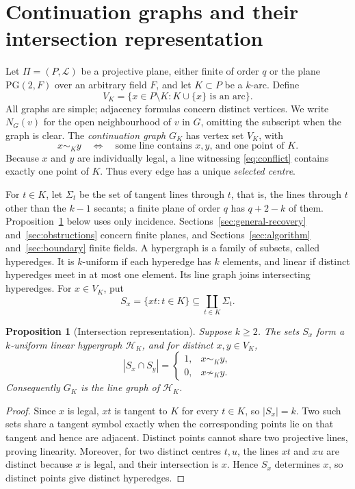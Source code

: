 \documentclass[11pt]{article}
\newtheorem{proposition}[theorem]{Proposition}
\theoremstyle{definition}
\theoremstyle{remark}
\newcommand{\PG}{\mathrm{PG}}
\newcommand{\cH}{\mathcal H}
\begin{document}
\section{Continuation graphs and their intersection representation}
\label{sec:def}

Let $\Pi=(P,\mathcal L)$ be a projective plane, either finite of order $q$
or the plane $\PG(2,F)$ over an arbitrary field $F$, and let
$K\subset P$ be a $k$-arc.  Define
\[
  V_K=\{x\in P\setminus K:K\cup\{x\}\text{ is an arc}\}.
\]
All graphs are simple; adjacency formulas concern distinct vertices.
We write $N_G(v)$ for the open neighbourhood of $v$ in $G$, omitting the
subscript when the graph is clear.
The \emph{continuation graph} $G_K$ has vertex set $V_K$, with
\begin{equation}
  x\sim_K y
  \quad\Longleftrightarrow\quad
  \text{some line contains $x,y$, and one point of $K$}.
  \label{eq:conflict}
\end{equation}
Because $x$ and $y$ are individually legal, a line witnessing \eqref{eq:conflict}
contains exactly one point of $K$.  Thus every edge has a unique
\emph{selected centre}.

For $t\in K$, let $\Sigma_t$ be the set of tangent lines through $t$,
that is, the lines through $t$ other than the $k-1$ secants; a finite
plane of order $q$ has $q+2-k$ of them. Proposition~\ref{prop:intersection}
below uses only incidence. Sections~\ref{sec:general-recovery}
and~\ref{sec:obstructions} concern finite planes, and
Sections~\ref{sec:algorithm} and~\ref{sec:boundary} finite fields.
A hypergraph is a family of subsets, called hyperedges. It is $k$-uniform
if each hyperedge has $k$ elements, and linear if distinct hyperedges
meet in at most one element. Its line graph joins intersecting hyperedges.
For $x\in V_K$, put
\[
  S_x=\{xt:t\in K\}\subseteq\coprod_{t\in K}\Sigma_t.
\]

\begin{proposition}[Intersection representation]\label{prop:intersection}
Suppose $k\ge2$. The sets $S_x$ form a $k$-uniform linear hypergraph
$\cH_K$, and for distinct $x,y\in V_K$,
\[
 |S_x\cap S_y|=
 \begin{cases}
 1,&x\sim_Ky,\\
 0,&x\not\sim_Ky.
 \end{cases}
\]
Consequently $G_K$ is the line graph of $\cH_K$.
\end{proposition}

\begin{proof}
Since $x$ is legal, $xt$ is tangent to $K$ for every $t\in K$, so
$|S_x|=k$.  Two such sets share a tangent symbol exactly when the
corresponding points lie on that tangent and hence are adjacent.  Distinct
points cannot share two projective lines, proving linearity. Moreover,
for two distinct centres $t,u$, the lines $xt$ and $xu$ are distinct
because $x$ is legal, and their intersection is $x$. Hence $S_x$ determines
$x$, so distinct points give distinct hyperedges.
\end{proof}
\end{document}
